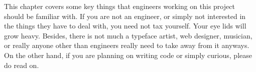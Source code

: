 

This chapter covers some key things that engineers working on this project should be familiar with. If you are not an engineer, or simply not interested in the things they have to deal with, you need not tax yourself. Your eye lids will grow heavy. Besides, there is not much a typeface artist, web designer, musician, or really anyone other than engineers really need to take away from it anyways. On the other hand, if you are planning on writing code or simply curious, please do read on.






\StopChapter

